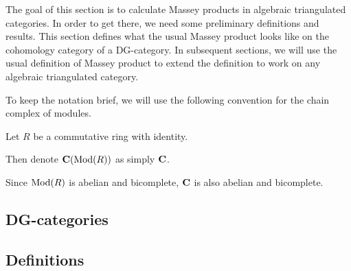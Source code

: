 The goal of this section is to calculate Massey products in algebraic triangulated categories. In order to get there, we need some preliminary definitions and results. This section defines what the usual Massey product looks like on the cohomology category of a DG-category. In subsequent sections, we will use the usual definition of Massey product to extend the definition to work on any algebraic triangulated category.

To keep the notation brief, we will use the following convention for the chain complex of modules.
\begin{notation}
    Let \( R \) be a commutative ring with identity.

    Then denote \( \operatorname{\mathbf{C}}(\operatorname{Mod}(R)) \) as simply \( \operatorname{\mathbf{C}} \).
\end{notation}

Since \( \operatorname{Mod}(R) \) is abelian and bicomplete, \( \operatorname{\mathbf{C}} \) is also abelian and bicomplete.

\subsection{DG-categories}


\subsection{Definitions}
